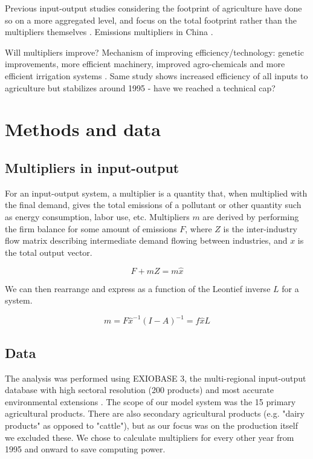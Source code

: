 \documentclass[a4paper,twoside]{article}
\begin{document}
Previous input-output studies considering the footprint of agriculture have done so on a more aggregated level, and focus on the total footprint rather than the multipliers themselves \cite{Camanzi2017}. Emissions multipliers in China \cite{Liu2017}.

Will multipliers improve? Mechanism of improving efficiency/technology: genetic improvements, more efficient machinery, improved agro-chemicals and more efficient irrigation systems \cite{Schneider2009}. Same study shows increased efficiency of all inputs to agriculture but stabilizes around 1995 - have we reached a technical cap?

\section{Methods and data}

\subsection{Multipliers in input-output}

For an input-output system, a multiplier is a quantity that, when multiplied with the final demand, gives the total emissions of a pollutant or other quantity such as energy consumption, labor use, etc. Multipliers $m$ are derived by performing the firm balance for some amount of emissions $F$, where $Z$ is the inter-industry flow matrix describing intermediate demand flowing between industries, and $x$ is the total output vector.

\begin{equation}
F + m Z = m \hat{x}
\end{equation}

We can then rearrange and express as a function of the Leontief inverse $L$ for a system.

\begin{equation}
m = F \hat{x}^{-1} (I - A)^{-1} = f \hat{x} L
\end{equation}

\subsection{Data}

The analysis was performed using EXIOBASE 3, the multi-regional input-output database with high sectoral resolution (200 products) and most accurate environmental extensions \cite{Stadler2018}. The scope of our model system was the 15 primary agricultural products. There are also secondary agricultural products (e.g. "dairy products" as opposed to "cattle"), but as our focus was on the production itself we excluded these. We chose to calculate multipliers for every other year from 1995 and onward to save computing power. 
\end{document}
